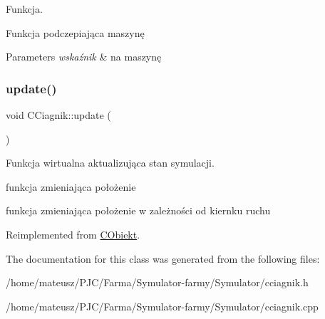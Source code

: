 Funkcja. 

Funkcja podczepiająca maszynę


\begin{DoxyParams}{Parameters}
{\em wskaźnik} & na maszynę \\
\hline
\end{DoxyParams}
\mbox{\label{class_c_ciagnik_a1596597ae77f6e71919e5c17affddad1}} 
\subsubsection{\texorpdfstring{update()}{update()}}
{\footnotesize\ttfamily void C\+Ciagnik\+::update (\begin{DoxyParamCaption}{ }\end{DoxyParamCaption})\hspace{0.3cm}{\ttfamily [virtual]}}



Funkcja wirtualna aktualizująca stan symulacji. 

funkcja zmieniająca położenie

funkcja zmieniająca położenie w zależności od kiernku ruchu 

Reimplemented from \mbox{\hyperlink{class_c_obiekt}{C\+Obiekt}}.



The documentation for this class was generated from the following files\+:\begin{DoxyCompactItemize}
\item 
/home/mateusz/\+P\+J\+C/\+Farma/\+Symulator-\/farmy/\+Symulator/cciagnik.\+h\item 
/home/mateusz/\+P\+J\+C/\+Farma/\+Symulator-\/farmy/\+Symulator/cciagnik.\+cpp\end{DoxyCompactItemize}
